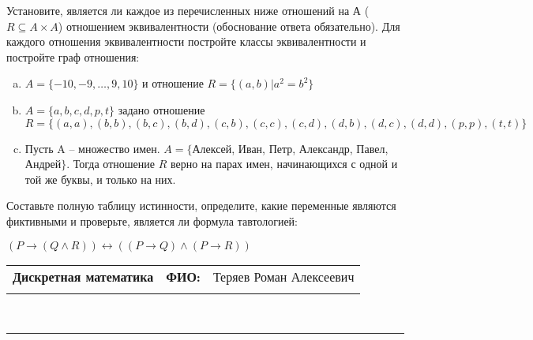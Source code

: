 \documentclass[10pt]{exam}
\newcommand{\class}{Дискретная математика}
\newcommand{\examdate}{}
\begin{document}
\begin{questions}
\question
Установите, является ли каждое из перечисленных ниже отношений на А ($R \subseteq A \times A$) отношением эквивалентности (обоснование ответа обязательно). Для каждого отношения эквивалентности постройте классы 
эквивалентности и постройте граф отношения:
\begin{enumerate} [a)]\setcounter{enumi}{0}
\item $A = \{-10, -9, … , 9, 10\}$ и отношение $R = \{(a,b)|a^{2} = b^{2}\}$
\item $A = \{a, b, c, d, p, t\}$ задано отношение $R = \{(a, a), (b, b), (b, c), (b, d), (c, b), (c, c), (c, d), (d, b), (d, c), (d, d), (p,p), (t,t)\}$
\item Пусть A – множество имен. $A = \{ $Алексей, Иван, Петр, Александр, Павел, Андрей$ \}$. Тогда отношение $R$ верно на парах имен, начинающихся с одной и той же буквы, и только на них.
\end{enumerate}\question Составьте полную таблицу истинности, определите, какие переменные являются фиктивными и проверьте, является ли формула тавтологией:

$(P \rightarrow (Q \land R)) \leftrightarrow ((P \rightarrow Q) \land (P \rightarrow R))$

\end{questions}
\newpage
\begin{flushright}
\begin{tabular}{p{2.8in} r l}
\textbf{\class} & \textbf{ФИО:} &Теряев Роман Алексеевич
\\

\textbf{\examdate} &&\\
\end{tabular}\\
\end{flushright}
\rule[1ex]{\textwidth}{.1pt}
\end{document}
